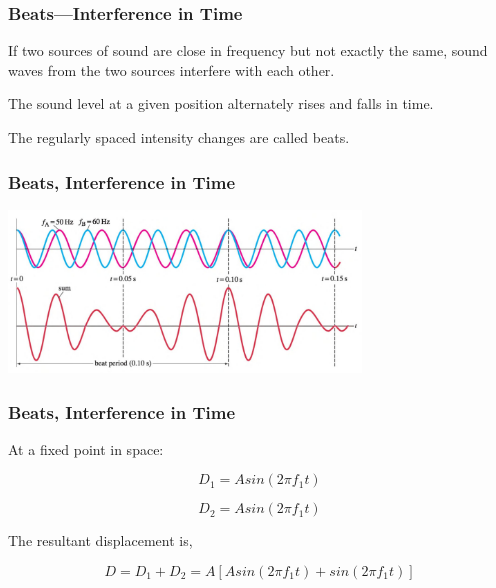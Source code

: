 \documentclass[]{beamer}
\begin{document}

\begin{frame}
\frametitle{Beats—Interference in Time}

 If two sources of sound are
close in frequency but not exactly the same, sound waves from the two sources interfere
with each other.
\pause
\vspace{3mm}

The sound level at a given position alternately rises and falls in time.
\pause
\vspace{3mm}


 The regularly spaced intensity changes are called beats.



  \end{frame}




\begin{frame}
\frametitle{Beats, Interference in Time}

  \begin{center}
  \includegraphics[height=1.7in]{images4/beats.jpg}
\end{center}


  \end{frame}




\begin{frame}
\frametitle{Beats, Interference in Time}


At a fixed point in space:

\begin{equation*}
D_1=Asin(2\pi f_1t)
\end{equation*}

\pause
\begin{equation*}
D_2=Asin(2\pi f_1t)
\end{equation*}
\pause

The resultant displacement is,

\pause

\begin{equation*}
D=D_1+D_2=A[Asin(2\pi f_1t)+sin(2\pi f_1t)]
\end{equation*}
\pause


  \end{frame}
\end{document}
